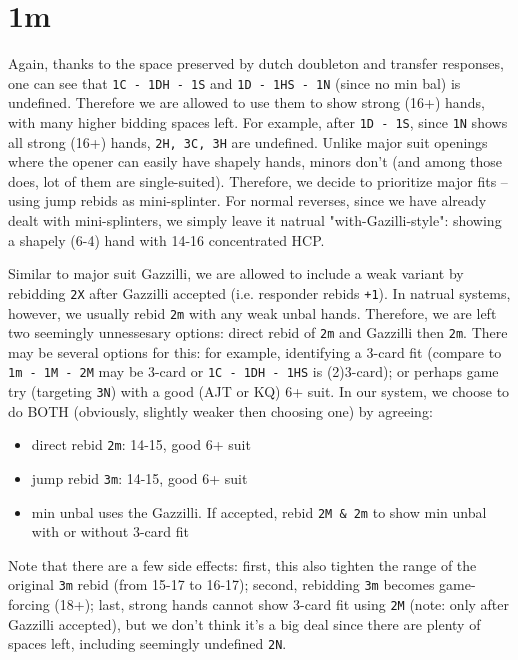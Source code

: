 \section{1m}

Again, thanks to the space preserved by dutch doubleton and transfer responses, one can see that \texttt{1C - 1DH - 1S} and \texttt{1D - 1HS - 1N} (since no min bal) is undefined.
Therefore we are allowed to use them to show strong (16+) hands, with many higher bidding spaces left. 
For example, after \texttt{1D - 1S}, since \texttt{1N} shows all strong (16+) hands, \texttt{2H, 3C, 3H} are undefined. 
Unlike major suit openings where the opener can easily have shapely hands, minors don't (and among those does, lot of them are single-suited). 
Therefore, we decide to prioritize major fits -- using jump rebids as mini-splinter. 
For normal reverses, since we have already dealt with mini-splinters, we simply leave it natrual "with-Gazilli-style": showing a shapely (6-4) hand with 14-16 concentrated HCP.


Similar to major suit Gazzilli, we are allowed to include a weak variant by rebidding \texttt{2X} after Gazzilli accepted (i.e. responder rebids \texttt{+1}).
In natrual systems, however, we usually rebid \texttt{2m} with any weak unbal hands. Therefore, we are left two seemingly unnessesary options: direct rebid of \texttt{2m} and Gazzilli then \texttt{2m}.
There may be several options for this: for example, identifying a 3-card fit (compare to \texttt{1m - 1M - 2M} may be 3-card or \texttt{1C - 1DH - 1HS} is (2)3-card); or perhaps game try (targeting \texttt{3N}) with a good (AJT or KQ) 6+ suit.
In our system, we choose to do BOTH (obviously, slightly weaker then choosing one) by agreeing:
\begin{itemize}
  \setlength\itemsep{0pt}
  \item direct rebid \texttt{2m}: 14-15, good 6+ suit
  \item jump rebid \texttt{3m}: 14-15, good 6+ suit
  \item min unbal uses the Gazzilli. If accepted, rebid \texttt{2M \& 2m} to show min unbal with or without 3-card fit
\end{itemize}
Note that there are a few side effects: first, this also tighten the range of the original \texttt{3m} rebid (from 15-17 to 16-17); 
second, rebidding \texttt{3m} becomes game-forcing (18+); 
last, strong hands cannot show 3-card fit using \texttt{2M} (note: only after Gazzilli accepted), but we don't think it's a big deal since there are plenty of spaces left, including seemingly undefined \texttt{2N}.

